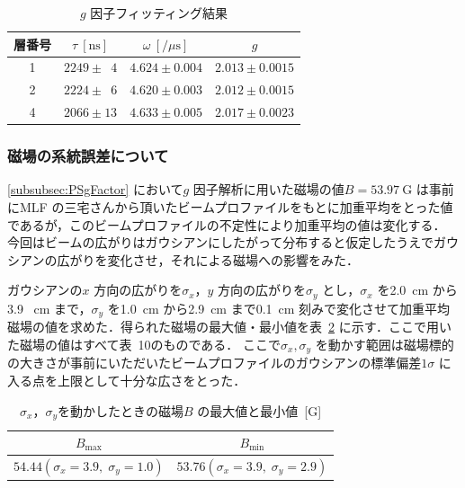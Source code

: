 \begin{table}[h]
	\centering
	\caption{$g$ 因子フィッティング結果}
	\begin{tabular}{cccc} \toprule
	層番号 & $\tau~[\mathrm{ns}]$ & $\omega~[/ \mu\mathrm{s}]$ & $g$ \\ \midrule
	1 & $2249 \pm \phantom{0}4$ & $4.624 \pm 0.004$ & $2.013 \pm 0.0015$ \\  
	2 & $2224 \pm \phantom{0}6$ & $4.620 \pm 0.003$ & $2.012 \pm 0.0015$ \\  
	4 & $2066 \pm 13$ & $4.633 \pm 0.005$ & $2.017 \pm 0.0023$ \\  \bottomrule
	\end{tabular}\label{tab:PSgFactor}
\end{table}%

\newpage

\subsubsection{磁場の系統誤差について}
\label{subsubsec:MagSysErr}

\ref{subsubsec:PSgFactor} において$g$ 因子解析に用いた磁場の値$B = 53.97~\mathrm{G}$ は事前にMLF の三宅さんから頂いたビームプロファイルをもとに加重平均をとった値であるが，このビームプロファイルの不定性により加重平均の値は変化する．
今回はビームの広がりはガウシアンにしたがって分布すると仮定したうえでガウシアンの広がりを変化させ，それによる磁場への影響をみた．

ガウシアンの$x$ 方向の広がりを$\sigma_{x}$，$y$ 方向の広がりを$\sigma_{y}$ とし，$\sigma_{x}$ を2.0~cm から3.9 ~cm まで，$\sigma_{y}$ を1.0~cm から2.9~cm まで0.1~cm 刻みで変化させて加重平均磁場の値を求めた．得られた磁場の最大値・最小値を表~\ref{tab:MagSysErr} に示す．ここで用いた磁場の値はすべて表~10のものである．
ここで$\sigma_{x}, \sigma_{y}$ を動かす範囲は磁場標的の大きさが事前にいただいたビームプロファイルのガウシアンの標準偏差$1\sigma$ に入る点を上限として十分な広さをとった．
\begin{table}[h]
	\centering
	\caption{$\sigma_{x}$，$\sigma_{y}$を動かしたときの磁場$B$ の最大値と最小値~[G]}
	\begin{tabular}{cc}\toprule
	$B_{\mathrm{max}}$ & $B_{\mathrm{min}}$ \\ \midrule
	$54.44 (\sigma_{x} = 3.9, \;\sigma_{y} = 1.0)$ & $53.76 (\sigma_{x} = 3.9, \;\sigma_{y} = 2.9)$ \\ \bottomrule 	
	\end{tabular}\label{tab:MagSysErr}
\end{table}%

